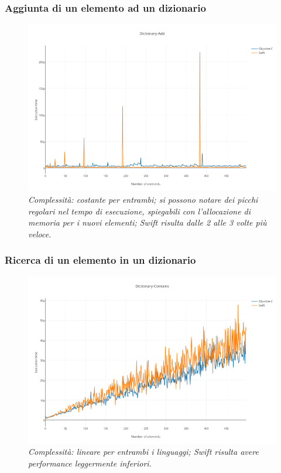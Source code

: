\subsubsection{Aggiunta di un elemento ad un dizionario}
\begin{figure}[H]
      \centering
      \includegraphics[scale=0.50]{immagini/dictionary_add.png}
            \vspace{0.8cm}
            \caption{\textit{Complessità: costante per entrambi; si possono notare dei picchi regolari nel tempo di esecuzione, spiegabili con l'allocazione di memoria per i nuovi elementi; Swift risulta dalle 2 alle 3 volte più veloce.}}
\end{figure} 
\subsubsection{Ricerca di un elemento in un dizionario}
\begin{figure}[H]
      \centering
      \includegraphics[scale=0.50]{immagini/dictionary_contains.png}
            \vspace{0.8cm}
            \caption{\textit{Complessità: lineare per entrambi i linguaggi; Swift risulta avere performance leggermente inferiori.}}
\end{figure}
